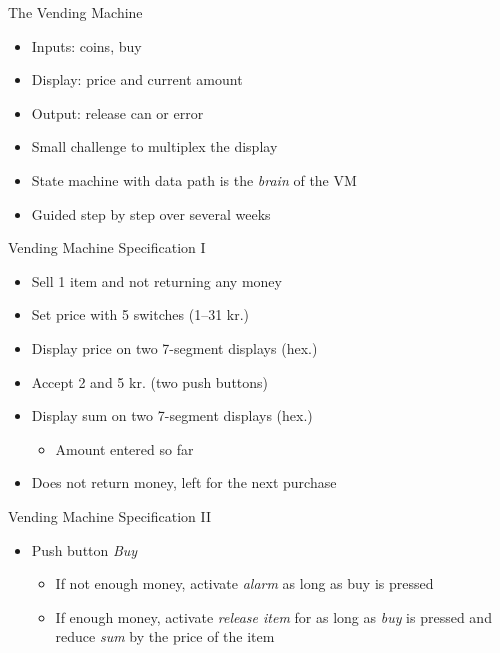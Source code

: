 \begin{frame}[fragile]{The Vending Machine}
\begin{itemize}
\item Inputs: coins, buy
\item Display: price and current amount
\item Output: release can or error
\item Small challenge to multiplex the display
\item State machine with data path is the \emph{brain} of the VM
\item Guided step by step over several weeks
\end{itemize}
\end{frame}

\begin{frame}[fragile]{Vending Machine Specification I}
\begin{itemize}
\item Sell 1 item and not returning any money
\item Set price with 5 switches (1--31 kr.)
\item Display price on two 7-segment displays (hex.)
\item Accept 2 and 5 kr. (two push buttons)
\item Display sum on two 7-segment displays (hex.)
\begin{itemize}
\item Amount entered so far
\end{itemize}
\item Does not return money, left for the next purchase
\end{itemize}
\end{frame}

\begin{frame}[fragile]{Vending Machine Specification II}
\begin{itemize}
\item Push button \emph{Buy}
\begin{itemize}
\item If not enough money, activate \emph{alarm} as long as buy is pressed
\item If enough money, activate \emph{release item} for as long as \emph{buy}
is pressed and reduce \emph{sum} by the price of the item
\end{itemize}
\end{itemize}
\end{frame}


